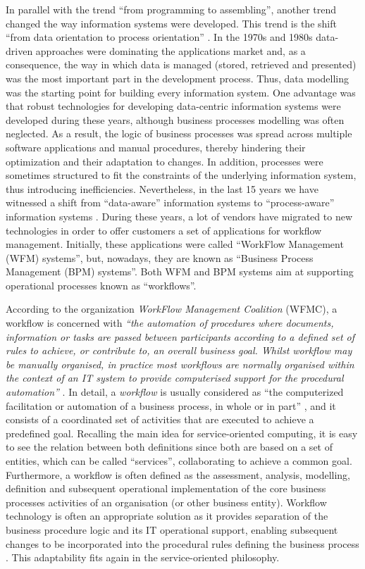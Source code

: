 In parallel with the trend ``from programming to assembling'', another trend
changed the way information systems were developed. This trend is the shift ``from
data orientation to process orientation'' \cite{DumasAalst2005}. In the 1970s and 1980s 
data-driven approaches were dominating
the applications market and, as a consequence, the way in which data is managed (stored, retrieved and presented) 
was the most important part in the development process. Thus, data
modelling was the starting point for building every information system. One advantage was that
robust technologies for developing data-centric information systems were developed during these years, although 
business processes modelling was often neglected. As a 
result, the logic of business processes was spread across multiple software
applications and manual procedures, thereby hindering their optimization and their
adaptation to changes. In addition, processes were sometimes structured to fit the
constraints of the underlying information system, thus introducing inefficiencies.
Nevertheless, in the last 15 years we have witnessed a shift from ``data-aware'' 
information systems to ``process-aware'' information systems \cite{DumasAalst2005}.
During these years, a lot of vendors have migrated to new technologies in order to offer customers a set of applications
for workflow management. Initially, these applications were called ``WorkFlow Management (WFM) systems'', but, nowadays,
they are known as ``Business Process Management (BPM) systems''. Both WFM and BPM systems aim at supporting operational
processes known as ``workflows''.

According to the organization \emph{WorkFlow Management Coalition} (WFMC), 
a workflow is concerned with \emph{``the automation of procedures where documents, information or tasks are passed
between participants according to a defined set of rules to achieve, or contribute to, an overall business goal.
Whilst workflow may be manually organised, in practice most workflows are normally
organised within the context of an IT system to provide
computerised support for the procedural automation''} \cite{Hollingsworth2004}.
In detail, a \emph{workflow} is usually considered as ``the computerized facilitation or automation of a
business process, in whole or in part'' \cite{EllisKeddara2000}, and it consists 
of a coordinated set of activities that are executed to achieve a predefined goal. Recalling the main idea for service-oriented computing, 
it is easy to see the relation between both definitions since both are based on a set of entities, which can be called ``services'', collaborating 
to achieve a common goal. Furthermore, a workflow is often defined as the assessment,
analysis, modelling, definition and subsequent operational implementation of the core business processes activities of an
organisation (or other business entity). Workflow technology is 
often an appropriate solution as it provides separation of the business procedure logic
and its IT operational support, enabling subsequent changes to be incorporated into the procedural rules
defining the business process \cite{DumasAalst2005}. This adaptability fits again in the service-oriented philosophy.

